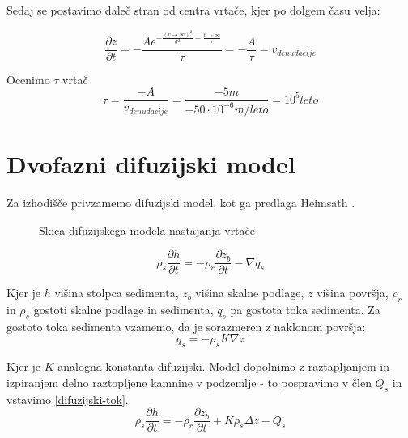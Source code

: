 \documentclass[a4paper, oneside, 12pt]{book}
\begin{document}
      Sedaj se postavimo daleč stran od centra vrtače, kjer po dolgem času velja:

      \begin{equation}
        \frac{\partial z}{\partial t} = -\frac{A e^{-\frac{(r \rightarrow \infty)^2}{\sigma ^2}-\frac{t \rightarrow \infty}{\tau }}}{\tau } = -\frac{A}{\tau} = v_{denudacije}
        \label{hitrost-denudacije}
      \end{equation}

      Ocenimo $\tau$ vrtač
      \begin{equation}
        \tau = \frac{-A}{v_{denudacije}}=\frac{-5m}{-50\cdot 10^{-6} m/leto} = 10^5 leto
        \label{tau-vrtace}
      \end{equation}

      \newpage

      \section{Dvofazni difuzijski model}

      Za izhodišče privzamemo difuzijski model, kot ga predlaga Heimsath \cite{Heimsath2001}.

      \begin{figure}[H]
        \centering
        
        \caption{Skica difuzijskega modela nastajanja vrtače}
        \label{fig:difuzijski-model}
      \end{figure}

      \begin{equation}
        \rho_s \frac{\partial h}{\partial t} = -\rho_r \frac{\partial z_b}{\partial t} - \nabla q_s
        \label{kontinuitetna-enacba-original}
      \end{equation}

      Kjer je $h$ višina stolpca sedimenta, $z_b$ višina skalne podlage, $z$ višina površja, $\rho_r$ in $\rho_s$ gostoti skalne podlage in sedimenta, $q_s$ pa gostota toka sedimenta. Za gostoto toka sedimenta vzamemo, da je sorazmeren z naklonom površja:
      \begin{equation}
        q_s = - \rho_s K \nabla z
        \label{difuzijski-tok}
      \end{equation}

      Kjer je $K$ analogna konstanta difuzijski.
      Model dopolnimo z raztapljanjem in izpiranjem delno raztopljene kamnine v podzemlje - to pospravimo v člen $Q_s$ in vstavimo \ref{difuzijski-tok}.
      \begin{equation}
        \rho_s \frac{\partial h}{\partial t} = -\rho_r \frac{\partial z_b}{\partial t} + K \rho_s \Delta z - Q_s
        \label{kontinuitetna-enacba-1}
      \end{equation}
\end{document}
